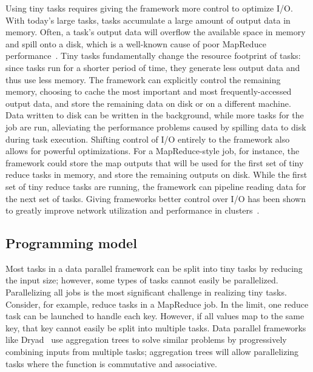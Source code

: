 Using tiny tasks requires giving the framework more control to optimize I/O.
With
today's large tasks, tasks accumulate a large amount of output data in memory.
Often, a task's output data will overflow the available space in memory
and spill onto a disk, which is a well-known cause of poor MapReduce
performance~\cite{lipcon2012optimizing}. Tiny tasks fundamentally change the
resource footprint of tasks: since tasks run for a shorter period of time,
they generate less output data and thus use less memory. The framework can
explicitly control the remaining memory, choosing to cache the most important
and most frequently-accessed output data, and store the remaining data on disk
or on a different machine. Data written to disk can be written in the
background, while more tasks for the job are run, alleviating the performance
problems caused by spilling data to disk during task execution.
Shifting control of I/O entirely to the framework also allows for
powerful optimizations.  For a MapReduce-style job, for instance, the
framework could store the map outputs that will be used for the first set of
tiny reduce tasks in memory, and store the remaining outputs on disk. While
the first set of tiny reduce tasks are running, the framework can pipeline
reading data for the next set of tasks.  Giving frameworks better control over
I/O has been shown
to greatly improve network utilization and performance in
clusters~\cite{chowdhury2011managing, chowdhury2012coflow}.

\subsection{Programming model}
\label{sec:prog}
Most tasks in a data parallel framework can be split into tiny tasks by
reducing the input size; however, some types of tasks cannot easily be
parallelized. Parallelizing all jobs is the most significant challenge
in realizing tiny tasks. 
Consider, for example, reduce tasks in a MapReduce job. In the limit,
one reduce task can be launched to handle each key. However, if all
values map to the same key, that key cannot easily be split into multiple
tasks.
Data parallel frameworks like Dryad~\cite{yu2008dryadlinq} use aggregation trees to solve
similar problems by progressively combining inputs from multiple tasks;
aggregation trees will allow parallelizing tasks where the function
is commutative and associative.

